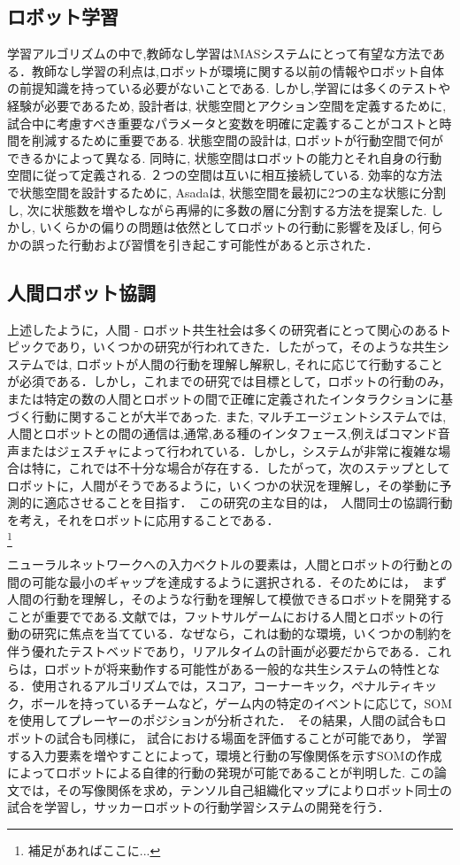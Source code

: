 \subsection{ロボット学習}%
学習アルゴリズムの中で,教師なし学習はMASシステムにとって有望な方法である．教師なし学習の利点は,ロボットが環境に関する以前の情報やロボット自体の前提知識を持っている必要がないことである. しかし,学習には多くのテストや経験が必要であるため, 設計者は, 状態空間とアクション空間を定義するために, 試合中に考慮すべき重要なパラメータと変数を明確に定義することがコストと時間を削減するために重要である. 状態空間の設計は, ロボットが行動空間で何ができるかによって異なる. 同時に, 状態空間はロボットの能力とそれ自身の行動空間に従って定義される. ２つの空間は互いに相互接続している. 効率的な方法で状態空間を設計するために, Asada\cite{YT}は, 状態空間を最初に2つの主な状態に分割し, 次に状態数を増やしながら再帰的に多数の層に分割する方法を提案した. しかし, いくらかの偏りの問題は依然としてロボットの行動に影響を及ぼし, 何らかの誤った行動および習慣を引き起こす可能性があると示された．
\subsection{人間ロボット協調}%
上述したように，人間 - ロボット共生社会は多くの研究者にとって関心のあるトピックであり，いくつかの研究が行われてきた．したがって，そのような共生システムでは, ロボットが人間の行動を理解し解釈し, それに応じて行動することが必須である．しかし，これまでの研究では目標として，ロボットの行動のみ，または特定の数の人間とロボットの間で正確に定義されたインタラクションに基づく行動に関することが大半であった. また, マルチエージェントシステムでは,人間とロボットとの間の通信は,通常,ある種のインタフェース,例えばコマンド音声またはジェスチャによって行われている．しかし，システムが非常に複雑な場合は特に，これでは不十分な場合が存在する．したがって，次のステップとしてロボットに，人間がそうであるように，いくつかの状況を理解し，その挙動に予測的に適応させることを目指す．　この研究の主な目的は，　人間同士の協調行動を考え，それをロボットに応用することである．\\

  \footnote{
補足があればここに...
} %

ニューラルネットワークへの入力ベクトルの要素は，人間とロボットの行動との間の可能な最小のギャップを達成するように選択される．そのためには，　まず人間の行動を理解し，そのような行動を理解して模倣できるロボットを開発することが重要でである.文献\cite{MM}では，フットサルゲームにおける人間とロボットの行動の研究に焦点を当てている．なぜなら，これは動的な環境，いくつかの制約を伴う優れたテストベッドであり，リアルタイムの計画が必要だからである．これらは，ロボットが将来動作する可能性がある一般的な共生システムの特性となる．使用されるアルゴリズムでは，スコア，コーナーキック，ペナルティキック，ボールを持っているチームなど，ゲーム内の特定のイベントに応じて，SOMを使用してプレーヤーのポジションが分析された．　その結果，人間の試合もロボットの試合も同様に， 試合における場面を評価することが可能であり， 学習する入力要素を増やすことによって，環境と行動の写像関係を示すSOMの作成によってロボットによる自律的行動の発現が可能であることが判明した. この論文では，その写像関係を求め，テンソル自己組織化マップによりロボット同士の試合を学習し，サッカーロボットの行動学習システムの開発を行う．

